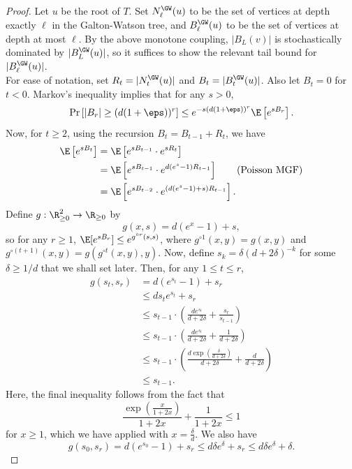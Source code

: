 \documentclass[11pt,letterpaper]{article}
\begin{document}
\begin{proof}
    Let $u$ be the root of $T$. Set $N^{\GW}_{\ell}(u)$ to be the set of vertices at depth exactly $\ell$ in the Galton-Watson tree, and $B^{\GW}_{\ell}(u)$ to be the set of vertices at depth at most $\ell$.
    By the above monotone coupling,  $|B_L(v)|$ is stochastically dominated by $|B^\GW_L(u)|$, so it suffices to show the relevant tail bound for $|B_\ell^{\GW}(u)|$.\\
    For ease of notation, set $R_t = |N^{\GW}_{t}(u)|$ and $B_t = |B^{\GW}_{t}(u)|$. Also let $B_t = 0$ for $t < 0$. Markov's inequality implies that for any $s > 0$,
    \[ \Pr\left[ |B_r| \ge (d(1+\eps))^r \right] \le e^{-s(d(1+\eps))^r} \E\left[ e^{sB_r} \right]. \]
    Now, for $t \ge 2$, using the recursion $B_t = B_{t-1} + R_t$, we have 
    \begin{align*}
        \E\left[ e^{sB_t} \right] &= \E\left[ e^{sB_{t-1}} \cdot e^{sR_t} \right] \\
            &= \E\left[ e^{sB_{t-1}} \cdot e^{d(e^s-1)R_{t-1}} \right] \tag{Poisson MGF} \\
            &= \E\left[ e^{sB_{t-2}} \cdot e^{(d(e^s-1) + s)R_{t-1}} \right]. 
    \end{align*}
    Define $g : \R_{\ge 0}^2 \to \R_{\ge 0}$ by
    \[ g(x,s) = d(e^x - 1) + s, \]
    so for any $r \ge 1$, $\E[e^{sB_r}] \le e^{g^{\circ r}(s,s)}$, where $g^{\circ 1}(x,y) = g(x,y)$ and $g^{\circ (t+1)}(x,y) = g(g^{\circ t}(x,y),y)$. Now, define $s_k = \delta (d+2\delta)^{-k}$ for some $\delta \ge 1/d$ that we shall set later. Then, for any $1 \le t \le r$,
    \begin{align*}
        g(s_t,s_r) &= d(e^{s_t} - 1) + s_r \\
            &\le d s_t e^{s_t} + s_r \\
            &\le s_{t-1} \cdot \left( \frac{de^{s_t}}{d+2\delta} + \frac{s_r}{s_{t-1}} \right) \\
            &\le s_{t-1} \cdot \left(\frac{de^{s_t}}{d+2\delta} + \frac{1}{d+2\delta}\right) \\
            &\le s_{t-1} \cdot \left(\frac{d\exp\left(\frac{\delta}{d+2\delta}\right)}{d+2\delta} + \frac{d}{d+2\delta}\right) \tag{$t \ge 1$} \\
            &\le s_{t-1}.
    \end{align*}
    Here, the final inequality follows from the fact that
    \[ \frac{\exp\left( \frac{x}{1+2x} \right)}{1+2x} + \frac{1}{1+2x} \le 1 \]
    for $x \ge 1$, which we have applied with $x = \frac{\delta}{d}$.
    We also have
    \[ g(s_0,s_r) = d(e^{s_0} - 1) + s_r \le d\delta e^{\delta} + s_r \le d\delta e^{\delta} + \delta. \]

\end{proof}
\end{document}
